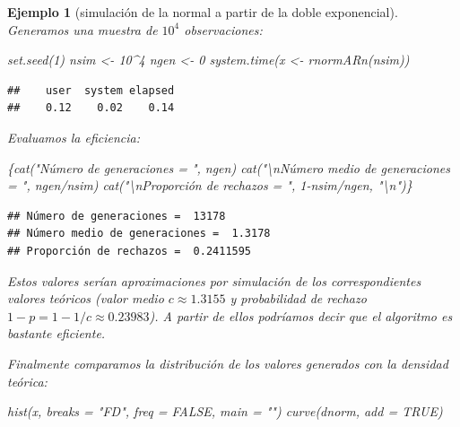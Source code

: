 \documentclass[
]{book}
\newenvironment{Shaded}{\begin{snugshade}}{\end{snugshade}}
\newcommand{\AttributeTok}[1]{\textcolor[rgb]{0.77,0.63,0.00}{#1}}
\newcommand{\ConstantTok}[1]{\textcolor[rgb]{0.00,0.00,0.00}{#1}}
\newcommand{\DecValTok}[1]{\textcolor[rgb]{0.00,0.00,0.81}{#1}}
\newcommand{\FunctionTok}[1]{\textcolor[rgb]{0.00,0.00,0.00}{#1}}
\newcommand{\NormalTok}[1]{#1}
\newcommand{\OtherTok}[1]{\textcolor[rgb]{0.56,0.35,0.01}{#1}}
\newcommand{\SpecialCharTok}[1]{\textcolor[rgb]{0.00,0.00,0.00}{#1}}
\newcommand{\StringTok}[1]{\textcolor[rgb]{0.31,0.60,0.02}{#1}}
\theoremstyle{break}
\newtheorem{example}{Ejemplo}[chapter]
\theoremstyle{nonumberplain}
\begin{document}
\begin{example}[simulación de la normal a partir de la doble exponencial]
Generamos una muestra de \(10^4\) observaciones:

\begin{Shaded}
\begin{Highlighting}[]
\FunctionTok{set.seed}\NormalTok{(}\DecValTok{1}\NormalTok{)}
\NormalTok{nsim }\OtherTok{\textless{}{-}} \DecValTok{10}\SpecialCharTok{\^{}}\DecValTok{4}
\NormalTok{ngen }\OtherTok{\textless{}{-}} \DecValTok{0}
\FunctionTok{system.time}\NormalTok{(x }\OtherTok{\textless{}{-}} \FunctionTok{rnormARn}\NormalTok{(nsim))}
\end{Highlighting}
\end{Shaded}

\begin{verbatim}
##    user  system elapsed 
##    0.12    0.02    0.14
\end{verbatim}

Evaluamos la eficiencia:

\begin{Shaded}
\begin{Highlighting}[]
\NormalTok{\{}\FunctionTok{cat}\NormalTok{(}\StringTok{"Número de generaciones = "}\NormalTok{, ngen)}
\FunctionTok{cat}\NormalTok{(}\StringTok{"}\SpecialCharTok{\textbackslash{}n}\StringTok{Número medio de generaciones = "}\NormalTok{, ngen}\SpecialCharTok{/}\NormalTok{nsim)}
\FunctionTok{cat}\NormalTok{(}\StringTok{"}\SpecialCharTok{\textbackslash{}n}\StringTok{Proporción de rechazos = "}\NormalTok{, }\DecValTok{1}\SpecialCharTok{{-}}\NormalTok{nsim}\SpecialCharTok{/}\NormalTok{ngen, }\StringTok{"}\SpecialCharTok{\textbackslash{}n}\StringTok{"}\NormalTok{)\}}
\end{Highlighting}
\end{Shaded}

\begin{verbatim}
## Número de generaciones =  13178
## Número medio de generaciones =  1.3178
## Proporción de rechazos =  0.2411595
\end{verbatim}

Estos valores serían aproximaciones por simulación de los correspondientes valores teóricos (valor medio \(c \approx 1.3155\) y probabilidad de rechazo \(1 - p = 1 - 1/c \approx 0.23983\)).
A partir de ellos podríamos decir que el algoritmo es bastante eficiente.

Finalmente comparamos la distribución de los valores generados con la densidad teórica:

\begin{Shaded}
\begin{Highlighting}[]
\FunctionTok{hist}\NormalTok{(x, }\AttributeTok{breaks =} \StringTok{"FD"}\NormalTok{, }\AttributeTok{freq =} \ConstantTok{FALSE}\NormalTok{, }\AttributeTok{main =} \StringTok{""}\NormalTok{)}
\FunctionTok{curve}\NormalTok{(dnorm, }\AttributeTok{add =} \ConstantTok{TRUE}\NormalTok{)}
\end{Highlighting}
\end{Shaded}


\end{example}
\end{document}
